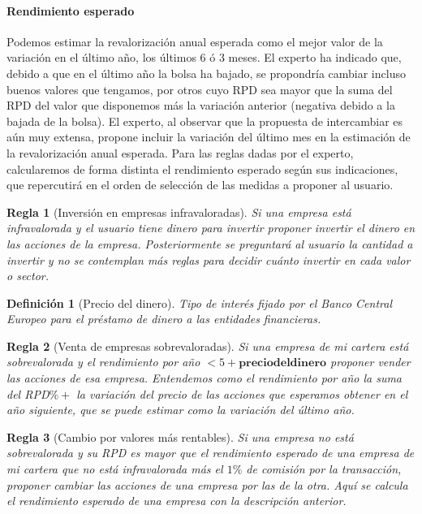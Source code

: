 \documentclass[11pt,leqno]{article}
\theoremstyle{definition_wo_parentheses}
\newtheorem{definicion}{Definición}[subsection]
\theoremstyle{plain}
\newtheorem{regla}{Regla}[subsection]
\theoremstyle{remark}
\begin{document}
\paragraph{Rendimiento esperado} Podemos estimar la revalorización anual esperada como el mejor valor de la variación en el último año, los últimos 6 ó 3 meses. El experto ha indicado que, debido a que en el último año la bolsa ha bajado, se propondría cambiar incluso buenos valores que tengamos, por otros cuyo RPD sea mayor que la suma del RPD del valor que disponemos más la variación anterior (negativa debido a la bajada de la bolsa). El experto, al observar que la propuesta de intercambiar es aún muy extensa, propone incluir la variación del último mes en la estimación de la revalorización anual esperada. Para las reglas dadas por el experto, calcularemos de forma distinta el rendimiento esperado según sus indicaciones, que repercutirá en el orden de selección de las medidas a proponer al usuario.

\begin{regla}[Inversión en empresas infravaloradas]
	 Si una empresa está infravalorada y el usuario tiene  dinero para invertir proponer invertir el dinero en las acciones de la empresa. Posteriormente se preguntará al usuario la cantidad a invertir y no se contemplan más reglas para decidir cuánto invertir en cada valor o sector.
\end{regla}	
	
\begin{definicion}[Precio del dinero]
	Tipo de interés fijado por el Banco Central Europeo para el préstamo de dinero a las entidades financieras. 
\end{definicion}

\begin{regla}[Venta de empresas sobrevaloradas]
	Si una empresa de mi cartera está sobrevalorada y el rendimiento por año $<5 +\mathbf{precio del dinero}$ proponer vender las acciones de esa empresa. Entendemos como el rendimiento por año la suma del RPD$\% +$ la variación del precio de las acciones que esperamos obtener en el año siguiente, que se puede estimar como la variación del último año.
\end{regla}	

\begin{regla}[Cambio por valores más rentables]
	 Si una empresa no está sobrevalorada y su RPD es mayor que el rendimiento esperado de una empresa de mi cartera que no está infravalorada más el $1\%$ de comisión por la transacción, proponer cambiar las acciones de una empresa por las de la otra. Aquí se calcula el rendimiento esperado de una empresa con la descripción anterior.
\end{regla}
\end{document}
